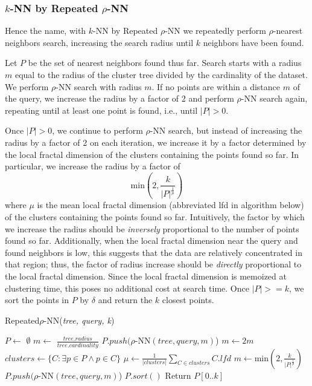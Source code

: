 \subsubsection{$k$-NN by Repeated $\rho$-NN}
\label{subsubsec:methods:knn-search:repeated-rnn}
Hence the name, with $k$-NN by Repeated $\rho$-NN we repeatedly perform
$\rho$-nearest neighbors search, increasing the search radius until $k$ neighbors
have been found.

Let $P$ be the set of nearest neighbors found thus far.
Search starts with a radius $m$ equal to the radius of the cluster tree divided by
the cardinality of the dataset. We perform $\rho$-NN search with radius $m$. 
If no points are within a distance $m$ of the query, we increase the radius by a factor of 
2 and perform $\rho$-NN search again, repeating until at least one point is found, i.e., 
until $|P| > 0$.

Once $|P| > 0$, we continue to perform $\rho$-NN search, but instead of 
increasing the radius by a factor of 2 on each iteration, we increase it by a factor determined 
by the local fractal dimension of the clusters containing the points found so far. In particular, 
we increase the radius by a factor of 
$$\text{min}\left(2, \frac{k}{|P|^{\frac{1}{\mu}}}\right)$$
where $\mu$ is the mean local fractal dimension (abbreviated lfd in algorithm below) of the clusters containing the points found so far.
Intuitively, the factor by which we increase the radius should be \emph{inversely} proportional to the number of points found so far. 
Additionally, when the local fractal dimension near the query and found neighbors is low, this suggests that the data 
are relatively concentrated in that region; thus, the factor of radius increase should be \emph{directly} proportional to the 
local fractal dimension. Since the local fractal dimension is memoized at clustering time, this poses no additional cost at search time.
Once $|P| >= k$, we sort the points in $P$ by $\delta$ and return the $k$ closest points.

\begin{algorithm} %
    \caption{Repeated$\rho$-NN(\emph{tree, query, k})} %
    \label{alg:knn-by-rnn} %
    \begin{algorithmic}[4] %
        \STATE $P \leftarrow$ $\emptyset$
        \STATE $m \leftarrow$ $\frac{tree.radius}{tree.cardinality}$
            \STATE $P.push(\rho$-NN$(tree, query, m)$)
            \STATE $m \leftarrow 2m$
        \ENDWHILE
            \STATE $clusters \leftarrow \{ C: \exists p \in P \land p \in C \}$
            \STATE $\mu \leftarrow \frac{1}{|clusters|} \sum_{C \in clusters} C.lfd$
            \STATE $m \leftarrow \text{min}\left(2, \frac{k}{|P|^{\frac{1}{\mu}}}\right)$
            \STATE $P.push(\rho$-NN$(tree, query, m)$)
        \ENDWHILE
        \STATE $P.sort()$
        \STATE Return $P[0..k]$
    \end{algorithmic}
    \end{algorithm}

